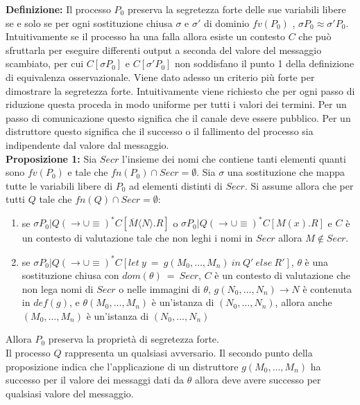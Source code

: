\documentclass[12pt]{article}
\begin{document}
\textbf{Definizione:} Il processo $P_0$ preserva la segretezza forte delle sue variabili libere se e solo se per ogni sostituzione chiusa $\sigma$ e $\sigma'$ di dominio $fv(P_0)$ , $\sigma P_0 \approx \sigma' P_0$.\\

Intuitivamente se il processo ha una falla allora esiste un contesto $C$ che può sfruttarla per eseguire differenti output a seconda del valore del messaggio scambiato, per cui $C[\sigma P_0]$ e $C[\sigma' P_0]$ non soddisfano il punto 1 della definizione di equivalenza osservazionale. Viene dato adesso un criterio più forte per dimostrare la segretezza forte. Intuitivamente viene richiesto che per ogni passo di riduzione questa proceda in modo uniforme per tutti i valori dei termini. Per un passo di comunicazione questo significa che il canale deve essere pubblico. Per un distruttore questo significa che il successo o il fallimento del processo sia indipendente dal valore dal messaggio.\\

\textbf{Proposizione 1:} Sia $Secr$ l'insieme dei nomi che contiene tanti elementi quanti sono $fv(P_0)$  e tale che $fn(P_0) \cap Secr = \emptyset$. Sia $\sigma$ una sostituzione che mappa tutte le variabili libere di $P_0$ ad elementi distinti di $Secr$. Si assume allora che per tutti $Q$ tale che $fn(Q) \cap Secr = \emptyset$:
\begin{enumerate}
    \item se $\sigma P_0 | Q (\rightarrow \cup \equiv)^* C[\overline{M} \langle N \rangle . R]$ o $\sigma P_0 | Q (\rightarrow \cup \equiv)^* C[M(x).R]$ e $C$ è un contesto di valutazione tale che non leghi i nomi in $Secr$ allora $M \notin Secr$.
    
    \item se $\sigma P_0 | Q (\rightarrow \cup \equiv)^* C[let\ y\ =\ g(M_0,\dots,M_n)\ in\ Q'\ else\ R']$, $\theta$ è una sostituzione chiusa con $dom(\theta)\ =\ Secr$, $C$ è un contesto di valutazione che non lega nomi di $Secr$ o nelle immagini di $\theta$, $g(N_0,\dots,N_n) \rightarrow N$ è contenuta in $def(g)$, e $\theta (M_0,\dots,M_n)$ è un'istanza di $(N_0,\dots,N_n)$, allora anche $(M_0,\dots,M_n)$ è un'istanza di $(N_0,\dots,N_n)$   
\end{enumerate}
Allora $P_0$ preserva la proprietà di segretezza forte.\\

Il processo $Q$ rappresenta un qualsiasi avversario. Il secondo punto della proposizione indica che l'applicazione di un distruttore $g(M_0,\dots,M_n)$ ha successo per il valore dei messaggi dati da $\theta$ allora deve avere successo per qualsiasi valore del messaggio.\\ 
\end{document}
